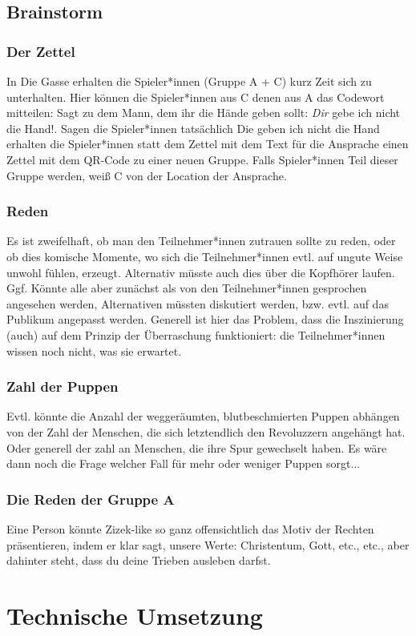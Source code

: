 \documentclass[a4paper, 12pt]{report}
\begin{document}
\section*{Brainstorm}

\subsection*{Der Zettel}
In \glqq Die Gasse\grqq{} erhalten die Spieler*innen (Gruppe A + C) kurz Zeit sich zu unterhalten.
Hier können die Spieler*innen aus C denen aus A das Codewort mitteilen:
\glqq Sagt zu dem Mann, dem ihr die Hände geben sollt: \glq \textit{Dir} gebe ich nicht die Hand!\grq\grqq.
Sagen die Spieler*innen tatsächlich \glqq Die geben ich nicht die Hand\grqq{} erhalten die Spieler*innen statt dem Zettel mit dem Text für die Ansprache einen Zettel mit dem QR-Code zu einer neuen Gruppe.
Falls Spieler*innen Teil dieser Gruppe werden, weiß C von der Location der Ansprache.

\subsection*{Reden}
Es ist zweifelhaft, ob man den Teilnehmer*innen zutrauen sollte zu reden, oder ob dies komische Momente, wo sich die Teilnehmer*innen evtl. auf ungute Weise unwohl fühlen, erzeugt.
Alternativ müsste auch dies über die Kopfhörer laufen. 
Ggf. Könnte alle aber zunächst als von den Teilnehmer*innen gesprochen angesehen werden, Alternativen müssten diskutiert werden, bzw. evtl. auf das Publikum angepasst werden. 
Generell ist hier das Problem, dass die Inszinierung (auch) auf dem Prinzip der Überraschung funktioniert: 
die Teilnehmer*innen wissen noch nicht, was sie erwartet.

\subsection*{Zahl der Puppen}\label{zahl_der_puppen}
Evtl. könnte die Anzahl der weggeräumten, blutbeschmierten Puppen abhängen von der Zahl der Menschen, die sich letztendlich den Revoluzzern angehängt hat. 
Oder generell der zahl an Menschen, die ihre Spur gewechselt haben.
Es wäre dann noch die Frage welcher Fall für mehr oder weniger Puppen sorgt...

\subsection*{Die Reden der Gruppe A}
Eine Person könnte Zizek-like so ganz offensichtlich das Motiv der Rechten präsentieren, indem er klar sagt, unsere Werte: Christentum, Gott, etc., etc., aber dahinter steht, dass du deine Trieben ausleben darfst.

\chapter*{Technische Umsetzung}\label{technische_umsetzung}
   
\printbibliography

\listoftodos
 
\end{document}
